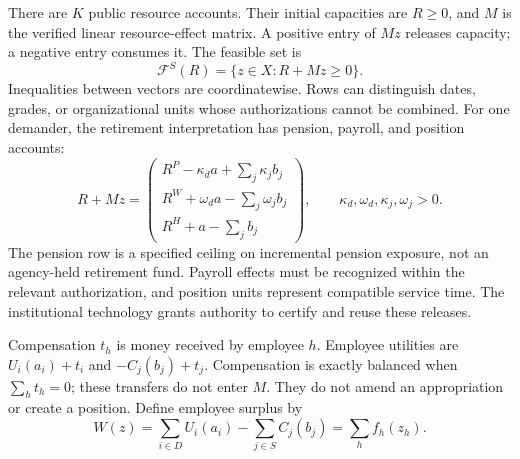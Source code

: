 \documentclass[ecta,draft]{econsocart}
\theoremstyle{definition}
\theoremstyle{definition}
\newcommand{\FS}{\mathcal F^{S}}
\begin{document}
There are $K$ public resource accounts. Their initial capacities are
$R\geq0$, and $M$ is the verified linear resource-effect matrix. A positive
entry of $Mz$ releases capacity; a negative entry consumes it. The feasible set is
\begin{equation}
 \FS(R)=\{z\in X:R+Mz\geq0\}.
 \label{eq:feasible}
\end{equation}
Inequalities between vectors are coordinatewise. Rows can distinguish dates,
grades, or organizational units whose authorizations cannot be combined. For
one demander, the retirement interpretation has pension, payroll, and position
accounts:
\begin{equation}
R+Mz=\begin{pmatrix}
 R^P-\kappa_da+\sum_j\kappa_jb_j\\
 R^W+\omega_da-\sum_j\omega_jb_j\\
 R^H+a-\sum_jb_j
\end{pmatrix},
\qquad \kappa_d,\omega_d,\kappa_j,\omega_j>0.
\label{eq:threeaccounts}
\end{equation}
The pension row is a specified ceiling on incremental pension exposure, not an
agency-held retirement fund. Payroll effects must be recognized within the
relevant authorization, and position units represent compatible service time.
The institutional technology grants authority to certify and reuse these releases.

Compensation $t_h$ is money received by employee $h$. Employee utilities are
$U_i(a_i)+t_i$ and $-C_j(b_j)+t_j$. Compensation is exactly balanced when
$\sum_h t_h=0$; these transfers do not enter $M$. They do not amend an
appropriation or create a position. Define employee surplus by
\begin{equation}
 W(z)=\sum_{i\in D}U_i(a_i)-\sum_{j\in S}C_j(b_j)
     =\sum_h f_h(z_h).
 \label{eq:welfare}
\end{equation}

\begin{center}
\end{center}
\end{document}
